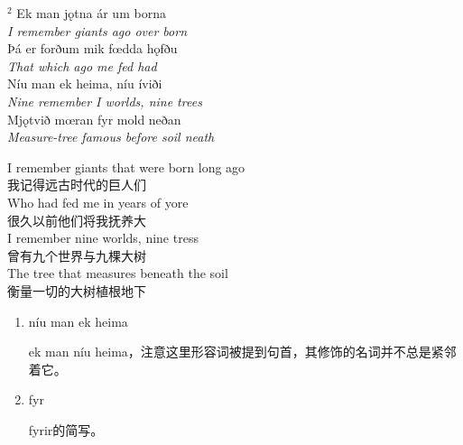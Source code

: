\begin{paracol}{2}
    \noindent
    $^2 $ Ek man jǫtna ár um borna\\
    \textit{I remember giants ago over born}\\
    Þá er forðum mik fœdda hǫfðu\\
    \textit{That which ago me fed had}\\
    Níu man ek heima, níu íviði\\
    \textit{Nine remember I worlds, nine trees}\\
    Mjǫtvið mœran fyr mold neðan\\
    \textit{Measure-tree famous before soil neath}\\
    \switchcolumn

    \noindent
    I remember giants that were born long ago\\
    我记得远古时代的巨人们\\
    Who had fed me in years of yore\\
    很久以前他们将我抚养大\\
    I remember nine worlds, nine tress\\
    曾有九个世界与九棵大树\\
    The tree that measures beneath the soil\\
    衡量一切的大树植根地下\\

\end{paracol}

\begin{grammar*}{}
    \begin{enumerate}[leftmargin=*]
        \item níu man ek heima

              ek man níu heima，注意这里形容词被提到句首，其修饰的名词并不总是紧邻着它。

        \item fyr

              fyrir的简写。
    \end{enumerate}
\end{grammar*}
\hspace*{\fill}\\ %

